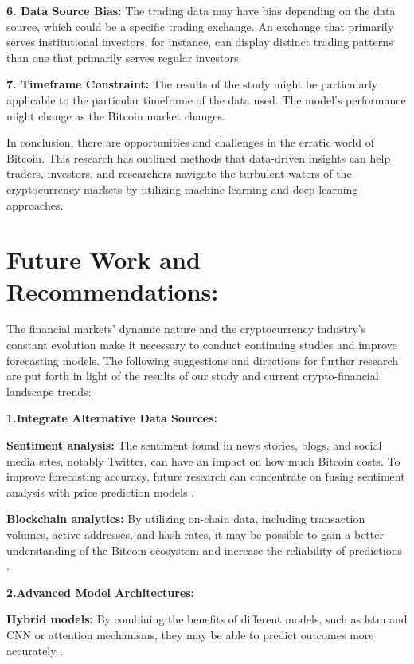 \textbf{6. Data Source Bias:} The trading data may have bias depending on the data source, which could be a specific trading exchange. An exchange that primarily serves institutional investors, for instance, can display distinct trading patterns than one that primarily serves regular investors.

\textbf{7. Timeframe Constraint:} The results of the study might be particularly applicable to the particular timeframe of the data used. The model’s performance might change as the Bitcoin market changes.


In conclusion, there are opportunities and challenges in the erratic world of Bitcoin. This research has outlined methods that data-driven insights can help traders, investors, and researchers navigate the turbulent waters of the cryptocurrency markets by utilizing machine learning and deep learning approaches.




\goodbreak
\section{Future Work and Recommendations:}

The financial markets' dynamic nature and the cryptocurrency industry's constant evolution make it necessary to conduct continuing studies and improve forecasting models. The following suggestions and directions for further research are put forth in light of the results of our study and current crypto-financial landscape trends:

\textbf{1.Integrate Alternative Data Sources:}

\textbf{Sentiment analysis:} The sentiment found in news stories, blogs, and social media sites, notably Twitter, can have an impact on how much Bitcoin costs. To improve forecasting accuracy, future research can concentrate on fusing sentiment analysis with price prediction models \citep{li2020survey}.

\textbf{Blockchain analytics:} By utilizing on-chain data, including transaction volumes, active addresses, and hash rates, it may be possible to gain a better understanding of the Bitcoin ecosystem and increase the reliability of predictions \citep{cong2021tokenomics}.

\textbf{2.Advanced Model Architectures:}

\textbf{Hybrid models:} By combining the benefits of different models, such as \gls{lstm} and CNN or attention mechanisms, they may be able to predict outcomes more accurately \citep{chong2017deep}.

